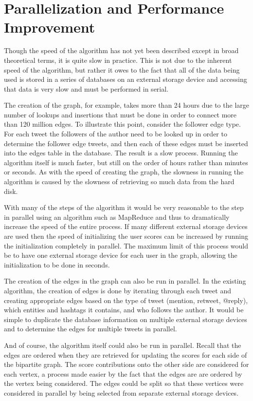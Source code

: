 \section{Parallelization and Performance Improvement}


Though the speed of the algorithm has not yet been described except in broad theoretical terms, it is quite slow in practice. This is not due to the inherent speed of the algorithm, but rather it owes to the fact that all of the data being used is stored in a series of databases on an external storage device and accessing that data is very slow and must be performed in serial.

The creation of the graph, for example, takes more than 24 hours due to the large number of lookups and insertions that must be done in order to connect more than 120 million edges. To illustrate this point, consider the follower edge type. For each tweet the followers of the author need to be looked up in order to determine the follower edge tweets, and then each of these edges must be inserted into the edges table in the database. The result is a slow process. Running the algorithm itself is much faster, but still on the order of hours rather than minutes or seconds. As with the speed of creating the graph, the slowness in running the algorithm is caused by the slowness of retrieving so much data from the hard disk.

With many of the steps of the algorithm it would be very reasonable to the step in parallel using an algorithm such as MapReduce and thus to dramatically increase the speed of the entire process. If many different external storage devices are used then the speed of initializing the user scores can be increased by running the initialization completely in parallel. The maximum limit of this process would be to have one external storage device for each user in the graph, allowing the initialization to be done in seconds.

The creation of the edges in the graph can also be run in parallel. In the existing algorithm, the creation of edges is done by iterating through each tweet and creating appropriate edges based on the type of tweet (mention, retweet, @reply), which entities and hashtags it contains, and who follows the author. It would be simple to duplicate the database information on multiple external storage devices and to determine the edges for multiple tweets in parallel.

And of course, the algorithm itself could also be run in parallel. Recall that the edges are ordered when they are retrieved for updating the scores for each side of the bipartite graph. The score contributions onto the other side are considered for each vertex, a process made easier by the fact that the edges are are ordered by the vertex being considered. The edges could be split so that these vertices were considered in parallel by being selected from separate external storage devices.

